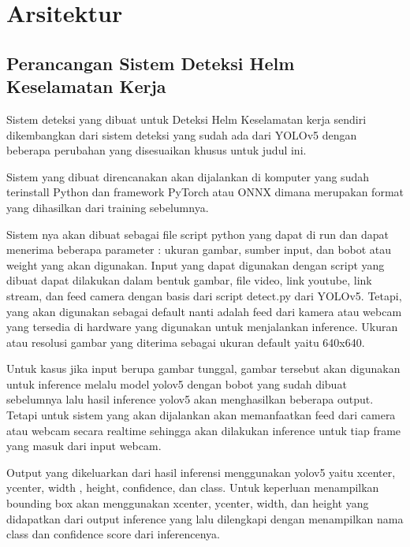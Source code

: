 \section{Arsitektur}
\label{sec:arsitektur}


\subsection{Perancangan Sistem Deteksi Helm Keselamatan Kerja}
\label{subsec:perancangansistemdeteksihelmkeselamatankerja}

Sistem deteksi yang dibuat untuk Deteksi Helm Keselamatan kerja sendiri dikembangkan dari sistem deteksi yang sudah ada dari YOLOv5 dengan beberapa perubahan yang disesuaikan khusus untuk judul ini. 

Sistem yang dibuat direncanakan akan dijalankan di komputer yang sudah terinstall Python dan framework PyTorch atau ONNX dimana merupakan format yang dihasilkan dari training sebelumnya.

Sistem nya akan dibuat sebagai file script python yang dapat di run dan dapat menerima beberapa parameter : ukuran gambar, sumber input, dan bobot atau weight yang akan digunakan. 
Input yang dapat digunakan dengan script yang dibuat dapat dilakukan dalam bentuk gambar, file video, link youtube, link stream, dan feed camera dengan basis dari script detect.py dari YOLOv5. Tetapi, yang akan digunakan sebagai default nanti adalah feed dari kamera atau webcam yang tersedia di hardware yang digunakan untuk menjalankan inference. Ukuran atau resolusi gambar yang diterima sebagai ukuran default yaitu 640x640. 

Untuk kasus jika input berupa gambar tunggal, gambar tersebut akan digunakan untuk inference melalu model yolov5 dengan bobot yang sudah dibuat sebelumnya lalu hasil inference yolov5 akan menghasilkan beberapa output. Tetapi untuk sistem yang akan dijalankan akan memanfaatkan feed dari camera atau webcam secara realtime sehingga akan dilakukan inference untuk tiap frame yang masuk dari input webcam.

Output yang dikeluarkan dari hasil inferensi menggunakan yolov5 yaitu xcenter, ycenter, width , height, confidence, dan class. Untuk keperluan menampilkan bounding box akan menggunakan xcenter, ycenter, width, dan height yang didapatkan dari output inference yang lalu dilengkapi dengan menampilkan nama class dan confidence score dari inferencenya. 

